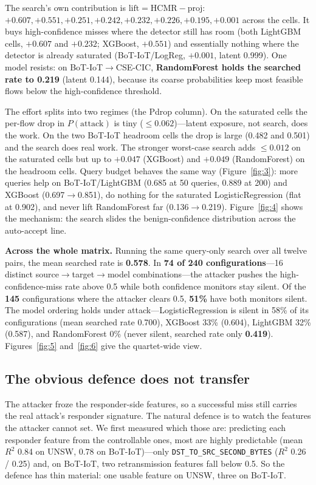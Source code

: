 \documentclass[11pt]{article}
\newcommand{\feat}[1]{\texttt{#1}}
\begin{document}
The search's own contribution is $\text{lift} = \text{HCMR} - \text{proj}$: $+0.607, +0.551, +0.251, +0.242, +0.232, +0.226, +0.195, +0.001$ across the cells. It buys high-confidence misses where the detector still has room (both LightGBM cells, $+0.607$ and $+0.232$; XGBoost, $+0.551$) and essentially nothing where the detector is already saturated (BoT-IoT/LogReg, $+0.001$, latent 0.999). One model resists: on BoT-IoT$\to$CSE-CIC, \textbf{RandomForest holds the searched rate to 0.219} (latent 0.144), because its coarse probabilities keep most feasible flows below the high-confidence threshold.

The effort splits into two regimes (the Pdrop column). On the saturated cells the per-flow drop in $P(\text{attack})$ is tiny ($\le 0.062$)---latent exposure, not search, does the work. On the two BoT-IoT headroom cells the drop is large (0.482 and 0.501) and the search does real work. The stronger worst-case search adds $\le 0.012$ on the saturated cells but up to $+0.047$ (XGBoost) and $+0.049$ (RandomForest) on the headroom cells. Query budget behaves the same way (Figure~\ref{fig:3}): more queries help on BoT-IoT/LightGBM (0.685 at 50 queries, 0.889 at 200) and XGBoost (0.697$\to$0.851), do nothing for the saturated LogisticRegression (flat at 0.902), and never lift RandomForest far (0.136$\to$0.219). Figure~\ref{fig:4} shows the mechanism: the search slides the benign-confidence distribution across the auto-accept line.

\textbf{Across the whole matrix.} Running the same query-only search over all twelve pairs, the mean searched rate is \textbf{0.578}. In \textbf{74 of 240 configurations}---16 distinct source$\to$target$\to$model combinations---the attacker pushes the high-confidence-miss rate above 0.5 while both confidence monitors stay silent. Of the \textbf{145} configurations where the attacker clears 0.5, \textbf{51\%} have both monitors silent. The model ordering holds under attack---LogisticRegression is silent in 58\% of its configurations (mean searched rate 0.700), XGBoost 33\% (0.604), LightGBM 32\% (0.587), and RandomForest 0\% (never silent, searched rate only \textbf{0.419}). Figures~\ref{fig:5} and~\ref{fig:6} give the quartet-wide view.

\subsection{The obvious defence does not transfer}
The attacker froze the responder-side features, so a successful miss still carries the real attack's responder signature. The natural defence is to watch the features the attacker cannot set. We first measured which those are: predicting each responder feature from the controllable ones, most are highly predictable (mean $R^2$ 0.84 on UNSW, 0.78 on BoT-IoT)---only \feat{DST\_TO\_SRC\_SECOND\_BYTES} ($R^2$ 0.26 / 0.25) and, on BoT-IoT, two retransmission features fall below 0.5. So the defence has thin material: one usable feature on UNSW, three on BoT-IoT.
\end{document}

